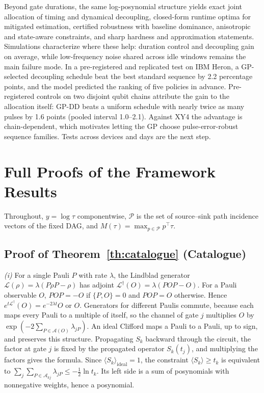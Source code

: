 \documentclass[10pt,letterpaper,journal]{IEEEtran}
\begin{document}
Beyond gate durations, the same log-posynomial structure yields exact joint allocation of timing and dynamical decoupling, closed-form runtime optima for mitigated estimation, certified robustness with baseline dominance, anisotropic and state-aware constraints, and sharp hardness and approximation statements. Simulations characterize where these help: duration control and decoupling gain on average, while low-frequency noise shared across idle windows remains the main failure mode. In a pre-registered and replicated test on IBM Heron, a GP-selected decoupling schedule beat the best standard sequence by 2.2 percentage points, and the model predicted the ranking of five policies in advance. Pre-registered controls on two disjoint qubit chains attribute the gain to the allocation itself: GP-DD beats a uniform schedule with nearly twice as many pulses by 1.6 points (pooled interval 1.0--2.1). Against XY4 the advantage is chain-dependent, which motivates letting the GP choose pulse-error-robust sequence families. Tests across devices and days are the next step.

\appendices

\section{Full Proofs of the Framework Results}\label{app:proofs}
Throughout, $y=\log\tau$ componentwise, $\mathcal P$ is the set of source--sink path incidence vectors of the fixed DAG, and $M(\tau)=\max_{p\in\mathcal P}p^\top\tau$.

\subsection{Proof of Theorem~\ref{th:catalogue} (Catalogue)}
\emph{(i)} For a single Pauli $P$ with rate $\lambda$, the Lindblad generator $\mathcal L(\rho)=\lambda(P\rho P-\rho)$ has adjoint $\mathcal L^\dagger(O)=\lambda(POP-O)$. For a Pauli observable $O$, $POP=-O$ if $\{P,O\}=0$ and $POP=O$ otherwise. Hence $e^{t\mathcal L^\dagger}(O)=e^{-2\lambda t}O$ or $O$. Generators for different Paulis commute, because each maps every Pauli to a multiple of itself, so the channel of gate $j$ multiplies $O$ by $\exp(-2\sum_{P\in\mathcal A(O)}\lambda_{jP})$. An ideal Clifford maps a Pauli to a Pauli, up to sign, and preserves this structure. Propagating $S_k$ backward through the circuit, the factor at gate $j$ is fixed by the propagated operator $S_k(t_j)$, and multiplying the factors gives the formula. Since $\langle S_k\rangle_{\mathrm{ideal}}=1$, the constraint $\langle S_k\rangle\ge t_k$ is equivalent to $\sum_j\sum_{P\in\mathcal A_{kj}}\lambda_{jP}\le-\tfrac12\ln t_k$. Its left side is a sum of posynomials with nonnegative weights, hence a posynomial.
\end{document}
